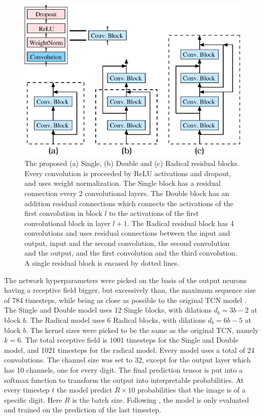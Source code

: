\documentclass[a4paper, twoside]{article}
\begin{document}
\begin{figure}
\begin{center}
    \includegraphics[width=12cm]{figGraph.eps}\caption{The proposed (a) Single, (b) Double and (c) Radical residual blocks. Every convolution is proceeded by ReLU activations and dropout, and uses weight normalization. The Single block has a residual connection every 2 convolutional layers. The Double block has an addition residual connections which connects the activations of the first convolution in block $l$ to the activations of the first convolutional block in layer $l+1$. The Radical residual block has 4 convolutions and uses residual connections between the input and output, input and the second convolution, the second convolution and the output, and the first convolution and the third convolution. A single residual block is encased by dotted lines.} \label{figTCNGraph}
\end{center}
\end{figure}

The network hyperparameters were picked on the basis of the output neurons having a receptive field bigger, but excessively than, the maximum sequence size of 784 timesteps, while being as close as possible to the original TCN model \cite{tcn}. The Single and Double model uses 12 Single blocks, with dilations $d_b=3b-2$ at block $b$. The Radical model uses 6 Radical blocks, with dilations $d_b=6b-5$ at block $b$. The kernel sizes were picked to be the same as the original TCN, namely $k=6$. The total receptive field is 1001 timesteps for the Single and Double model, and 1021 timesteps for the radical model. Every model uses a total of 24 convolutions. The channel size was set to 32, except for the output layer which has 10 channels, one for every digit. The final prediction tensor is put into a softmax function to transform the output into interpretable probabilities. At every timestep $t$ the model predict $R \times 10$ probabilities that the image is of a specific digit. Here $R$ is the batch size. Following \cite{tcn}, the model is only evaluated and trained on the prediction of the last timestep.
\end{document}
